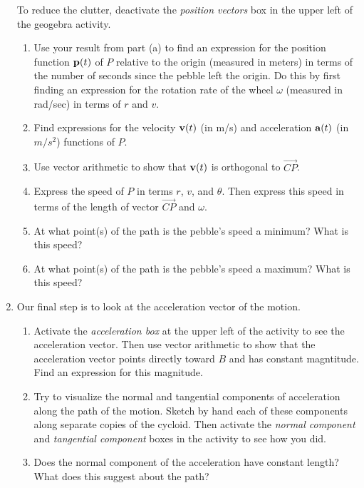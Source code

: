 \documentclass{ximera}
\begin{document}
\begin{question}
\begin{enumerate}
To reduce the clutter, deactivate the \emph{position vectors} box in the upper left of the geogebra activity.

\begin{enumerate}
\item Use your result from part (a) to find an expression for the position function ${\bf p}(t)$ of $P$ relative to the origin (measured in meters) in terms of the number of seconds since the pebble left the origin. Do this by first finding an expression for the rotation rate of the wheel $\omega$ (measured in rad/sec) in terms of $r$ and $v$.

\item Find expressions for the velocity ${\bf v}(t)$ (in m/s) and acceleration ${\bf a}(t)$ (in $m/s^2$) functions of $P$.

\item Use vector arithmetic to show that ${\bf v}(t)$ is orthogonal to $\overrightarrow{ CP}$.

\item Express the speed of $P$ in terms $r$, $v$, and $\theta$. Then express this speed in terms of the length of vector $\overrightarrow{CP}$ and $\omega$.

\item At what point(s) of the path is the pebble's speed a minimum? What is this speed?

\item At what point(s) of the path is the pebble's speed a maximum? What is this speed?
\end{enumerate}

\item Our final step is to look at the acceleration vector of the motion.

\begin{enumerate}
\item Activate the \emph{acceleration box} at the upper left of the activity to see the acceleration vector. Then use vector arithmetic to show that the acceleration vector points directly toward $B$ and has constant magntitude. Find an expression for this magnitude.

\item Try to visualize the normal and tangential components of acceleration along the path of the motion. Sketch by hand each of these components along separate copies of the cycloid. Then activate the \emph{normal component} and \emph{tangential component} boxes in the activity to see how you did.

\item Does the normal component of the acceleration have constant length? What does this suggest about the path?


\end{enumerate}
\end{enumerate}
\end{question}
\end{document}
